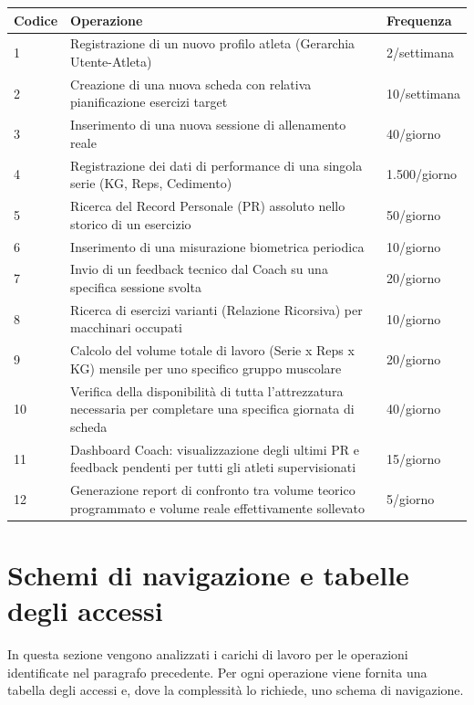 \documentclass[12pt]{report}
\begin{document}
\begin{longtable}{|l|p{9.5cm}|l|}
\hline
\textbf{Codice} & \textbf{Operazione} & \textbf{Frequenza} \\ \hline
\endhead
1 & Registrazione di un nuovo profilo atleta (Gerarchia Utente-Atleta) & 2/settimana \\ \hline
2 & Creazione di una nuova scheda con relativa pianificazione esercizi target & 10/settimana \\ \hline
3 & Inserimento di una nuova sessione di allenamento reale & 40/giorno \\ \hline
4 & Registrazione dei dati di performance di una singola serie (KG, Reps, Cedimento) & 1.500/giorno \\ \hline
5 & Ricerca del Record Personale (PR) assoluto nello storico di un esercizio & 50/giorno \\ \hline
6 & Inserimento di una misurazione biometrica periodica & 10/giorno \\ \hline
7 & Invio di un feedback tecnico dal Coach su una specifica sessione svolta & 20/giorno \\ \hline
8 & Ricerca di esercizi varianti (Relazione Ricorsiva) per macchinari occupati & 10/giorno \\ \hline
9 & Calcolo del volume totale di lavoro (Serie x Reps x KG) mensile per uno specifico gruppo muscolare & 20/giorno \\ \hline
10 & Verifica della disponibilità di tutta l'attrezzatura necessaria per completare una specifica giornata di scheda & 40/giorno \\ \hline
11 & Dashboard Coach: visualizzazione degli ultimi PR e feedback pendenti per tutti gli atleti supervisionati & 15/giorno \\ \hline
12 & Generazione report di confronto tra volume teorico programmato e volume reale effettivamente sollevato & 5/giorno \\ \hline
\end{longtable}

\section{Schemi di navigazione e tabelle degli accessi}
In questa sezione vengono analizzati i carichi di lavoro per le operazioni identificate nel paragrafo precedente. Per ogni operazione viene fornita una tabella degli accessi e, dove la complessità lo richiede, uno schema di navigazione.
\end{document}
